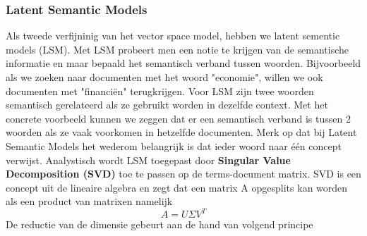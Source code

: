 \subsubsection{Latent Semantic Models}\label{Latent Semantic Models}

Als tweede verfijninig van het vector space model, hebben we latent sementic models (LSM). Met LSM probeert men een notie te krijgen van de semantische informatie en maar bepaald het semantisch verband tussen woorden. Bijvoorbeeld als we zoeken naar documenten met het woord "economie", willen we ook documenten met "financi\"en" terugkrijgen. Voor LSM zijn twee woorden semantisch gerelateerd als ze gebruikt worden in dezelfde context. Met het concrete voorbeeld kunnen we zeggen dat er een semantisch verband is tussen 2 woorden als ze vaak voorkomen in hetzelfde documenten.
\newline
Merk op dat bij Latent Semantic Models het wederom belangrijk is dat ieder woord naar \'e\'en concept verwijst.
%
\newline
Analystisch wordt LSM toegepast door \textbf{Singular Value Decomposition (SVD)} toe te passen op de terms-document matrix. SVD is een concept uit de lineaire algebra en zegt dat een matrix A opgesplits kan worden als een product van matrixen namelijk \\
\[A = U\Sigma V^T \]
De reductie van de dimensie gebeurt aan de hand van volgend principe
%
\newcommand{\vect}{\mathbf}
\newcommand{\nul}{\operatorname{Nul}}
\newcommand{\col}{\operatorname{Kolommen }}
\newcommand{\row}{\operatorname{Rijen}}
